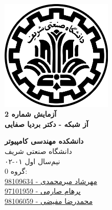 \documentclass{article}
\begin{document}
\begin{titlepage}
	\begin{center}
		\vspace{0.2cm}
		
		\includegraphics[width=0.4\textwidth]{sharif.png}\\
		\vspace{0.2cm}
		\textbf{ \Huge{آزمایش شماره 2}}\\
		\vspace{0.25cm}
		\textbf{ \Large{آز شبکه - دکتر بردیا صفایی}}
		\vspace{0.2cm}
		
		
		\large \textbf{دانشکده مهندسی کامپیوتر}\\\vspace{0.1cm}
		\large   دانشگاه صنعتی شریف\\\vspace{0.2cm}
		\large   ﻧﯿﻢ‌سال اول ۰۱-۰۲ \\\vspace{0.10cm}
		\large{ گروه 0:}\\
		\large{\href{mailto:mehrshad.mirmohammadi@gmail.com}{مهرشاد میرمحمدی - 98109634}}\\
		\large{\href{mailto:parhaamsaremi@gmail.com}{پرهام صارمی - 97101959}}\\
		\large{\href{mailto:mofayezi.m@gmail.com}{محمدرضا مفیضی - 98106059}}\\
	\end{center}
\end{titlepage}

\newpage

\pagestyle{fancy}
\fancyhf{}
\fancyfoot{}
\setlength{\headheight}{59pt}
\cfoot{\thepage}
\end{document}

